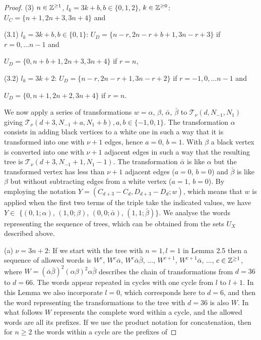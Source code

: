 \documentclass[10pt,a4paper]{amsart}
\begin{document}
\begin{proof}
   (3) $n \in {\Bbb{Z}}^{\geq 1}$, $l_{k}=3k+b, b\in \{ 0, 1, 2 \}$, $k \in {\Bbb{Z}}^{\geq 0}$: $U_{C}=\{n+1, 2n+3, 3n+4\}$ and 
 
 (3.1) $l_{k}=3k+b, b\in \{ 0, 1\}$: $U_{D}=\{n-r, 2n-r+b+1, 3n-r+3\}$ if $r = 0, \dots n -1$ and 
 
 $U_{D}=\{0, n+b+1, 2n+3, 3n+4\}$ if $r = n$,
 
 (3.2) $l_{k}=3k+2$:  $U_{D}=\{n-r, 2n-r+1, 3n-r+2\}$ if $r = -1, 0, \dots n -1$ and 
 
 $U_{D}=\{0, n+1, 2n+2, 3n+4\}$ if $r = n$.
 


    \bigskip\par 
 We now apply a series of transformations $w= \alpha$, $\beta$, $\bar{\alpha}$, $\bar{\beta}$ to $\mathcal{T}_{\nu}(d, N_{-1}, N_{1})$ giving $\mathcal{T}_{\nu}(d+3, N_{-1}+a, N_{1}+b), a,b \in \{-1,0,1\}$. The transformation $\alpha$ consists in adding black vertices to a white one in such a way that it is transformed into one with $\nu+1$ edges, hence $a=0$, $b=1$. With $\beta$ a black vertex is converted into one with $\nu+1$ adjacent edges in such a way that the resulting tree is $\mathcal{T}_{\nu}(d+3, N_{-1}+1, N_{1}-1)$. The transformation $\bar{\alpha}$ is like $\alpha$ but the transformed vertex has less than $\nu+1$ adjacent edges ($a=0$, $b=0$) and  $\bar{\beta}$ is like $\beta$ but without subtracting edges from a white vertex ($a=1$, $b=0$). By employing the notation  $Y= (C_{d+3}- C_{d}, D_{d+3}- D_{d}; w)$, which means that $w$ is applied when the first two terms of the triple take the indicated values, we have $Y \in$ $\{(0,1; \alpha)$,  $(1,0; \beta)$, $(0, 0; \bar{\alpha})$,  $(1, 1; \bar{\beta})\}$. We analyse the words representing the sequence of trees, which can be obtained from the sets $U_{X}$ described above.
 
      \bigskip\par 
 
(a) $\nu= 3n+2$: If we start with the tree with $n=1, l=1$ in Lemma 2.5 then a sequence of allowed words is $W^{c}$, $W^{c}\bar{\alpha}$, $W^{c}\bar{\alpha}\bar{\beta}$, $\dots$, $W^{c+1}$, $W^{c+1}\bar{\alpha}$, $\dots $, $c \in  {\Bbb{Z}}^{\geq 1}$, where $W=(\bar{\alpha}\bar{\beta})^{2}(\alpha\beta)^{2}\alpha\bar{\beta}$ describes the chain of transformations from $d=36$ to $d=66$. The words appear repeated in cycles with one cycle from $l$ to $l+1$. In this Lemma we also incorporate $l=0$, which corresponds here to $d=6$, and then the word representing the transformations to the tree with $d=36$ is also $W$. In what follows $W$ represents the complete word within a cycle, and the allowed words are all its prefixes. If we use the product notation for concatenation, then for $n \geq 2$  the words within a cycle are the prefixes of 


\end{proof}
\end{document}
